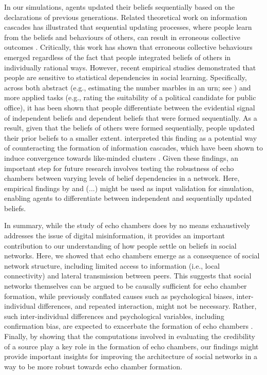 \documentclass[doc,floatsintext]{apa6}
\begin{document}
In our simulations, agents updated their beliefs sequentially based on the declarations of previous generations. Related theoretical work on information cascades has illustrated that sequential updating processes, where people learn from the beliefs and behaviours of others, can result in erroneous collective outcomes \citep{bikhchandani1992theory}. Critically, this work has shown that erroneous collective behaviours emerged regardless of the fact that people integrated beliefs of others in individually rational ways. However, recent empirical studies demonstrated that people are sensitive to statistical dependencies in social learning. Specifically, across both abstract (e.g., estimating the number marbles in an urn; see \citet{whalen2018sensitivity}) and more applied tasks (e.g., rating the suitability of a political candidate for public office), it has been shown that people differentiate between the evidential signal of independent beliefs and dependent beliefs that were formed sequentially. As a result, given that the beliefs of others were formed sequentially, people updated their prior beliefs to a smaller extent. \cite{whalen2018sensitivity} interpreted this finding as a potential way of counteracting the formation of information cascades, which have been shown to induce convergence towards like-minded clusters \citep{bikhchandani1998learning}. Given these findings, an important step for future research involves testing the robustness of echo chambers between varying levels of belief dependencies in a network. Here, empirical findings by \citep{whalen2018sensitivity} and (...) might be used as input validation for simulation, enabling agents to differentiate between independent and sequentially updated beliefs. 

In summary, while the study of echo chambers does by no means exhaustively addresses the issue of digital misinformation, it provides an important contribution to our understanding of how people settle on beliefs in social networks. Here, we showed that echo chambers emerge as a consequence of social network structure, including limited access to information (i.e., local connectivity) and lateral transmission between peers. This suggests that social networks themselves can be argued to be causally sufficient for echo chamber formation, while previously conflated causes such as psychological biases, inter-individual differences, and repeated interaction, might not be necessary. Rather, such inter-individual differences and psychological variables, including confirmation bias, are expected to exacerbate the formation of echo chambers \citep{pilditch2017opinion}. Finally, by showing that the computations involved in evaluating the credibility of a source play a key role in the formation of echo chambers, our findings might provide important insights for improving the architecture of social networks in a way to be more robust towards echo chamber formation.
\end{document}
